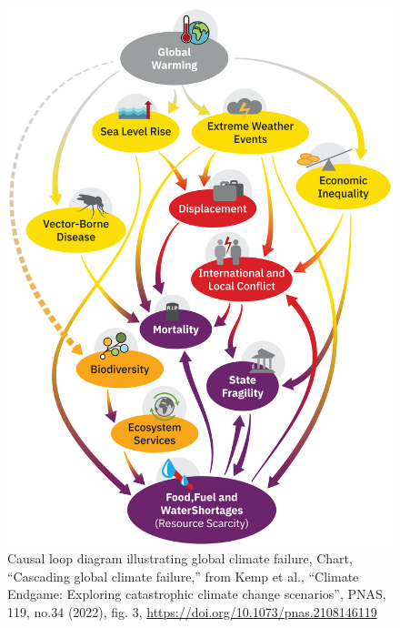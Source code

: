 \documentclass[12pt, a4paper, twoside]{article}
\begin{document}
\newpage

\begin{figure}[h!]
\centering
\includegraphics[width=0.9\linewidth]{pnas.2108146119fig03.jpg}
\caption{Causal loop diagram illustrating global climate failure, Chart, “Cascading global climate failure,” from Kemp et al., “Climate Endgame: Exploring catastrophic climate change scenarios”, PNAS, 119, no.34 (2022), fig. 3, \url{https://doi.org/10.1073/pnas.2108146119}}
\end{figure}

\newpage



\printbibliography
\end{document}
